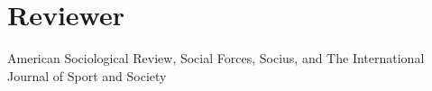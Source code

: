 \documentclass[letterpaper]{article}
\begin{document}
\section*{\textbf{Reviewer}}

American Sociological Review, Social Forces, Socius, and The International Journal of Sport and Society


\iffalse

\section*{\textbf{References}}

\begin{minipage}{0.4\linewidth}
  \href{ http://www.soc.umn.edu/~uggen/}{Chris Uggen} \\
   Distinguished McKnight Professor \\
   \href{http://www.umn.edu/}{University of Minnesota}\\
  \href{mailto:uggen001@umn.edu}{uggen001@umn.edu}
\end{minipage}
\begin{minipage}{0.33\linewidth}
  \href{http://cla.umn.edu/about/directory/profile/hartm021}{Doug Hartmann} \\
   Professor of Sociology \\
   \href{http://www.umn.edu/}{University of Minnesota}\\
  \href{mailto:hartm021@umn.edu}{hartm021@umn.edu}
\end{minipage}

\begin{minipage}{0.33\linewidth}
  \href{https://academics.skidmore.edu/blogs/alindner/}{Andrew Lindner} \\
   Associate Professor of Sociology \\
   \href{http://www.skidmore.edu/}{Skidmore College}\\
  \href{mailto:alindner@skidmore.edu}{alindner@skidmore.edu}
\end{minipage}







\fi
\end{document}
